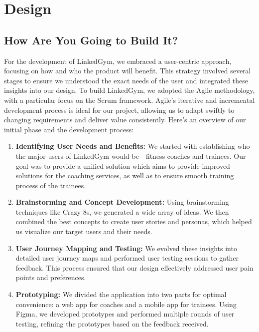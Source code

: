 \section{Design}
\label{sec:Design}

\subsection{How Are You Going to Build It?}
For the development of LinkedGym, we embraced a user-centric approach, focusing on how and who the product will benefit. This strategy involved several stages to ensure we understood the exact needs of the user and integrated these insights into our design. To build LinkedGym, we adopted the Agile methodology, with a particular focus on the Scrum framework. Agile's iterative and incremental development process is ideal for our project, allowing us to adapt swiftly to changing requirements and deliver value consistently. Here's an overview of our initial phase and the development process:

\begin{enumerate}
  \item \textbf{Identifying User Needs and Benefits:} We started with establishing who the major users of LinkedGym would be—fitness coaches and trainees. Our goal was to provide a unified solution which aims to provide improved solutions for the coaching services, as well as to ensure smooth training process of the trainees.
  
  \item \textbf{Brainstorming and Concept Development:} Using brainstorming techniques like Crazy 8s, we generated a wide array of ideas. We then combined the best concepts to create user stories and personas, which helped us visualize our target users and their needs.
  
  \item \textbf{User Journey Mapping and Testing:} We evolved these insights into detailed user journey maps and performed user testing sessions to gather feedback. This process ensured that our design effectively addressed user pain points and preferences.
  
  \item \textbf{Prototyping:} We divided the application into two parts for optimal convenience: a web app for coaches and a mobile app for trainees. Using Figma, we developed prototypes and performed multiple rounds of user testing, refining the prototypes based on the feedback received.
\end{enumerate}

